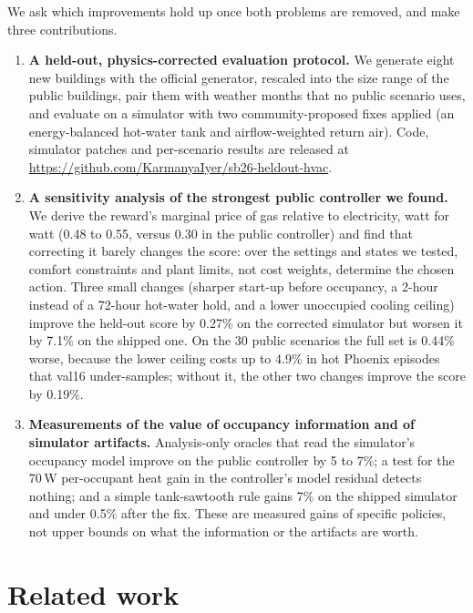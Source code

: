 \documentclass{article}
\begin{document}
We ask which improvements hold up once both problems are removed, and make three contributions.
\begin{enumerate}
  \item \textbf{A held-out, physics-corrected evaluation protocol.} We generate eight new buildings with the official generator, rescaled into the size range of the public buildings, pair them with weather months that no public scenario uses, and evaluate on a simulator with two community-proposed fixes applied (an energy-balanced hot-water tank and airflow-weighted return air). Code, simulator patches and per-scenario results are released at \url{https://github.com/KarmanyaIyer/sb26-heldout-hvac}.
  \item \textbf{A sensitivity analysis of the strongest public controller we found.} We derive the reward's marginal price of gas relative to electricity, watt for watt (0.48 to 0.55, versus 0.30 in the public controller) and find that correcting it barely changes the score: over the settings and states we tested, comfort constraints and plant limits, not cost weights, determine the chosen action. Three small changes (sharper start-up before occupancy, a 2-hour instead of a 72-hour hot-water hold, and a lower unoccupied cooling ceiling) improve the held-out score by 0.27\% on the corrected simulator but worsen it by 7.1\% on the shipped one. On the 30 public scenarios the full set is 0.44\% worse, because the lower ceiling costs up to 4.9\% in hot Phoenix episodes that val16 under-samples; without it, the other two changes improve the score by 0.19\%.
  \item \textbf{Measurements of the value of occupancy information and of simulator artifacts.} Analysis-only oracles that read the simulator's occupancy model improve on the public controller by 5 to 7\%; a test for the 70\,W per-occupant heat gain in the controller's model residual detects nothing; and a simple tank-sawtooth rule gains 7\% on the shipped simulator and under 0.5\% after the fix. These are measured gains of specific policies, not upper bounds on what the information or the artifacts are worth.
\end{enumerate}

\section{Related work}
\end{document}
